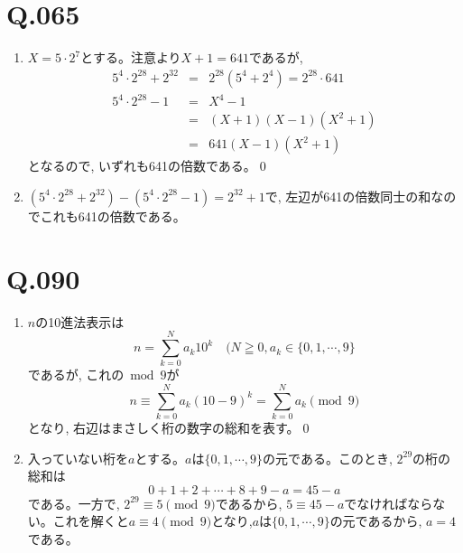 \documentclass[twocolumn]{jbook}
\newcommand{\disp}{\displaystyle}
\newcommand{\ben}{\begin{enumerate}}
\newcommand{\een}{\end{enumerate}}
\newcommand{\beqn}{\begin{eqnarray*}}
\newcommand{\eeqn}{\end{eqnarray*}}
\renewcommand{\geq}{\geqq}
\begin{document}
\section*{Q.065}
\ben
\item $X=5\cdot 2^{7}$とする。注意より$X+1=641$であるが, 
\beqn
5^{4}\cdot 2^{28} + 2^{32} &=& 2^{28}(5^4+2^4)=2^{28}\cdot 641\\
5^{4}\cdot 2^{28}-1 &=& X^4-1 \\
&=& (X+1)(X-1)(X^2+1)\\
&=&641(X-1)(X^2+1)
\eeqn
となるので, いずれも641の倍数である。\qed
\item $(5^4\cdot 2^{28}+2^{32}) - (5^4\cdot 2^{28} -1) = 2^{32}+1$で, 左辺が641の倍数同士の和なのでこれも641の倍数である。
\een

\section*{Q.090}
\ben
\item $n$の10進法表示は
\[n=\disp\sum_{k=0}^{N}a_k10^{k} \quad (N\geq 0, a_k\in \{0,1,\cdots, 9 \}\]
であるが, これの$\bmod{9}$が
\[n\equiv \disp\sum_{k=0}^{N}a_k(10-9)^{k} = \disp\sum_{k=0}^{N} a_k \pmod{9}\]
となり, 右辺はまさしく桁の数字の総和を表す。\qed
\item 入っていない桁を$a$とする。$a$は$\{ 0,1,\cdots, 9\}$の元である。このとき, $2^{29}$の桁の総和は
\[0+1+2+\cdots + 8+9 - a= 45-a\]
である。一方で, $2^{29}\equiv 5 \pmod{9}$であるから, $5\equiv 45-a$でなければならない。これを解くと$a\equiv 4\pmod{9}$となり,$a$は$\{ 0,1,\cdots, 9\}$の元であるから, $a=4$である。
\een

\clearpage
\end{document}
